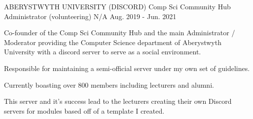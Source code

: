 \begin{cventries}
  \cventry
    {ABERYSTWYTH UNIVERSITY (DISCORD)} %
    {Comp Sci Community Hub Administrator (volunteering)} %
    {N/A} %
    {Aug. 2019 - Jun. 2021} %
    {
      \begin{cvitems} %
        \item {Co-founder of the Comp Sci Community Hub and the main Administrator / Moderator providing the Computer Science department of Aberystwyth University with a discord server to serve as a social environment.}
        \item {Responsible for maintaining a semi-official server under my own set of guidelines.}
        \item {Currently boasting over 800 members including lecturers and alumni.}
        \item {This server and it's success lead to the lecturers creating their own Discord servers for modules based off of a template I created.}
      \end{cvitems}
    }
    
    


\end{cventries}
